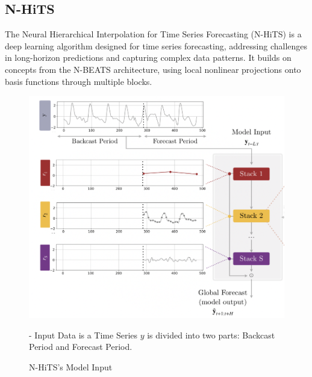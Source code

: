 \documentclass{ieeeojies}
\begin{document}
\subsection{N-HiTS}
The Neural Hierarchical Interpolation for Time Series Forecasting (N-HiTS) is a deep learning algorithm designed for time series forecasting, addressing challenges in long-horizon predictions and capturing complex data patterns. It builds on concepts from the N-BEATS architecture, using local nonlinear projections onto basis functions through multiple blocks.
\begin{figure}[H]
    \centering
    \begin{minipage}{0.50\textwidth}
    \centering
    \includegraphics[width=1\textwidth]{N-HiTS Model Input.png}
    \caption{N-HiTS’s Model Input}
    \label{fig:1}
    \end{minipage}
    \begin{minipage}{0.50\textwidth}
    - Input Data is a Time Series \( y \) is divided into two parts: Backcast Period and Forecast Period.
    \end{minipage}
\end{figure}
\end{document}
